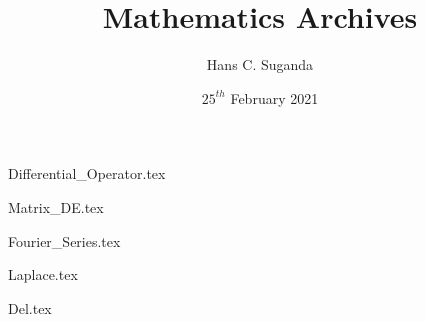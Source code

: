 \documentclass[a4paper, 12pt]{report}
\begin{document}
\title{Mathematics Archives}
\author{Hans C. Suganda}
\date{$25^{th}$ February 2021}
\maketitle
\newpage

\tableofcontents

\begin{center}
{Differential_Operator.tex}
\begin{comment}
Start Level: Chapter
End Level: Chapter
Aditional Comments:
\end{comment}
{Matrix_DE.tex}
\begin{comment}
Start Level: Chapter
End Level: Chapter
Aditional Comments:
\end{comment}
{Fourier_Series.tex}
\begin{comment}
Start Level: Chapter
End Level: Chapter
Aditional Comments:
\end{comment}
{Laplace.tex}
\begin{comment}
Start Level: Chapter
End Level: Chapter
Aditional Comments:
\end{comment}
\begin{comment}
Start Level: Chapter
End Level: Chapter
Aditional Comments:
\end{comment}
{Del.tex}
\begin{comment}

\end{comment}
\end{center}
\end{document}
